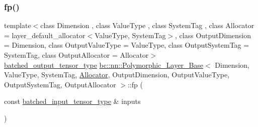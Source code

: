 \subsubsection{\texorpdfstring{fp()}{fp()}\hspace{0.1cm}{\footnotesize\ttfamily [2/2]}}
{\footnotesize\ttfamily template$<$class Dimension , class Value\+Type , class System\+Tag , class Allocator  = layer\+\_\+default\+\_\+allocator$<$\+Value\+Type, System\+Tag$>$, class Output\+Dimension  = Dimension, class Output\+Value\+Type  = Value\+Type, class Output\+System\+Tag  = System\+Tag, class Output\+Allocator  = Allocator$>$ \\
\hyperlink{structbc_1_1nn_1_1Polymorphic__Layer__Base_a45ed57549be9c4e5c40c52168ca15ae9}{batched\+\_\+output\+\_\+tensor\+\_\+type} \hyperlink{structbc_1_1nn_1_1Polymorphic__Layer__Base}{bc\+::nn\+::\+Polymorphic\+\_\+\+Layer\+\_\+\+Base}$<$ Dimension, Value\+Type, System\+Tag, \hyperlink{classbc_1_1allocators_1_1Allocator}{Allocator}, Output\+Dimension, Output\+Value\+Type, Output\+System\+Tag, Output\+Allocator $>$\+::fp (\begin{DoxyParamCaption}\item[{const \hyperlink{structbc_1_1nn_1_1Polymorphic__Layer__Base_ae694b03dd73923ff973b0d2c9156e161}{batched\+\_\+input\+\_\+tensor\+\_\+type} \&}]{inputs }\end{DoxyParamCaption})\hspace{0.3cm}{\ttfamily [inline]}}

\mbox{\label{structbc_1_1nn_1_1Polymorphic__Layer__Base_a987b737aeb1b1000dcb1b67ea551087b}} 

